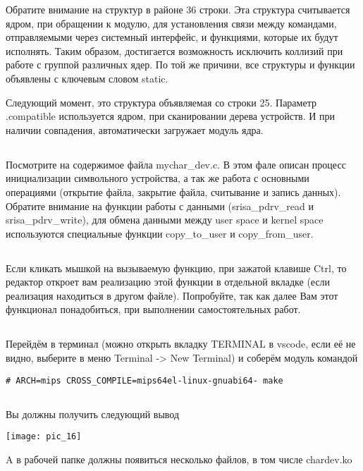 Обратите внимание на структур в районе 36 строки. Эта структура считывается ядром, при обращении к модулю, для установления связи между командами, отправляемыми через системный интерфейс, и функциями, которые их будут исполнять. Таким образом, достигается возможность исключить коллизий при работе с группой различных ядер. По той же причини, все структуры и функции объявлены с ключевым словом static.

Следующий момент, это структура объявляемая со строки 25. Параметр .compatible используется ядром, при сканировании дерева устройств. И при наличии совпадения, автоматически загружает модуль ядра.  


\subsection{}Посмотрите на содержимое файла mychar\_dev.c. В этом фале описан процесс инициализации символьного устройства, а так же работа с основными операциями (открытие файла, закрытие файла, считывание и запись данных).
Обратите внимание на функции работы с данными (srisa\_pdrv\_read и srisa\_pdrv\_write), для обмена данными между user space и kernel space используются специальные функции copy\_to\_user и copy\_from\_user.

\subsection{}Если кликать мышкой на вызываемую функцию, при зажатой клавише Ctrl, то редактор откроет вам реализацию этой функции в отдельной вкладке (если реализация находиться в другом файле). Попробуйте, так как далее Вам этот функционал понадобиться, при выполнении самостоятельных работ.

\subsection{}Перейдём в терминал (можно открыть вкладку TERMINAL в vscode, если её не видно, выберите в меню Terminal -> New Terminal) и соберём модуль командой
\begin{lstlisting}[style=bash]
# ARCH=mips CROSS_COMPILE=mips64el-linux-gnuabi64- make
\end{lstlisting}

\subsection{}Вы должны получить следующий вывод
\begin{center}
	\texttt{[image: pic\_16]}
\end{center}
A в рабочей папке должны появиться несколько файлов, в том числе chardev.ko

